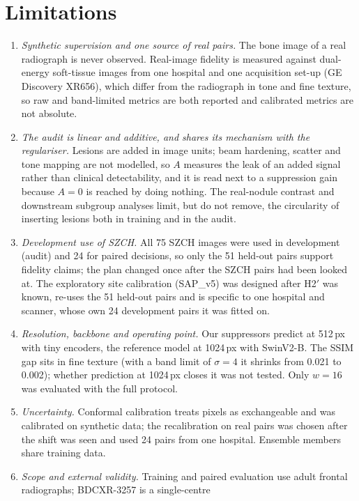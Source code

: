 \section{Limitations}
\label{sec:limitations}
\begin{enumerate}
\item \emph{Synthetic supervision and one source of real pairs.} The bone image of a real radiograph is never observed. Real-image fidelity
 is measured against dual-energy soft-tissue images from one hospital and one acquisition set-up (GE Discovery XR656), which differ from the
 radiograph in tone and fine texture, so raw and band-limited metrics are both reported and calibrated metrics are not absolute.
\item \emph{The audit is linear and additive, and shares its mechanism with the regulariser.} Lesions are added in image units; beam
 hardening, scatter and tone mapping are not modelled, so $A$ measures the leak of an added signal rather than clinical detectability, and it
 is read next to a suppression gain because $A=0$ is reached by doing nothing. The real-nodule contrast and downstream subgroup analyses
 limit, but do not remove, the circularity of inserting lesions both in training and in the audit.
\item \emph{Development use of SZCH.} All 75 SZCH images were used in development (audit) and 24 for paired decisions, so only the 51
 held-out pairs support fidelity claims; the plan changed once after the SZCH pairs had been looked at. The exploratory site calibration
 (SAP\_v5) was designed after H2$'$ was known, re-uses the 51 held-out pairs and is specific to one hospital and scanner, whose own 24
 development pairs it was fitted on.
\item \emph{Resolution, backbone and operating point.} Our suppressors predict at 512\,px with tiny encoders, the reference model at
 1024\,px with SwinV2-B. The SSIM gap sits in fine texture (with a band limit of $\sigma=4$ it shrinks from 0.021 to 0.002); whether
 prediction at 1024\,px closes it was not tested. Only $w=16$ was evaluated with the full protocol.
\item \emph{Uncertainty.} Conformal calibration treats pixels as exchangeable and was calibrated on synthetic data; the recalibration on real
 pairs was chosen after the shift was seen and used 24 pairs from one hospital. Ensemble members share training data.
\item \emph{Scope and external validity.} Training and paired evaluation use adult frontal radiographs; BDCXR-3257 is a single-centre

\end{enumerate}
